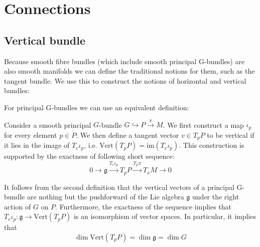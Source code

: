 \section{Connections}
\subsection{Vertical bundle}
	
	Because smooth fibre bundles (which include smooth principal G-bundles) are also smooth manifolds we can define the traditional notions for them, such as the tangent bundle. We use this to construct the notions of horizontal and vertical bundles:

	For principal G-bundles we can use an equivalent definition:
	\begin{adefinition}
		Consider a smooth principal $G$-bundle $G\hookrightarrow P\xrightarrow{\pi} M$. We first construct a map $\iota_p$ for every element $p\in P$:
		We then define a tangent vector $v\in T_p P$ to be vertical if it lies in the image of $T_e\iota_p$, i.e. $\text{Vert}(T_pP) = \text{im}(T_e\iota_p)$. This construction is supported by the exactness of following short sequence:
		\begin{equation}
			0\xrightarrow{} \mathfrak{g} \xrightarrow{T_e\iota_p} T_p P\xrightarrow{T_p\pi} T_xM \xrightarrow{} 0
		\end{equation}
	\end{adefinition}
	\begin{property}[Dimension]
		It follows from the second definition that the vertical vectors of a principal G-bundle are nothing but the pushforward of the Lie algebra $\mathfrak{g}$ under the right action of $G$ on $P$. Furthermore, the exactness of the sequence implies that $T_e\iota_p:\mathfrak{g}\rightarrow\text{Vert}(T_pP)$ is an isomorphism of vector spaces. In particular, it implies that
		\begin{equation}
			\label{manifolds:vertical_dimension}
			\dim\text{Vert}(T_pP) = \dim\mathfrak{g} = \dim G
		\end{equation}
	\end{property}
	

